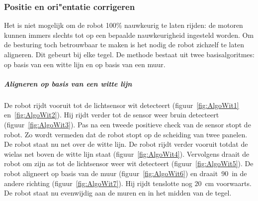 \documentclass[eind]{penoverslag}
\begin{document}
\subsubsection{Positie en ori"entatie corrigeren}
\label{sssec:AlgoAllign}
Het is niet mogelijk om de robot 100\% nauwkeurig te laten rijden: de motoren kunnen immers slechts tot op een bepaalde nauwkeurigheid ingesteld worden. Om de besturing toch betrouwbaar te maken is het nodig de robot zichzelf te laten aligneren. Dit gebeurt bij elke tegel.
De methode bestaat uit twee basisalgoritmes: op basis van een witte lijn en op basis van een muur.

\subparagraph{Aligneren op basis van een witte lijn}
De robot rijdt vooruit tot de lichtsensor wit detecteert (figuur~\ref{fig:AlgoWit1} en~\ref{fig:AlgoWit2}). Hij rijdt verder tot de sensor weer bruin detecteert (figuur~\ref{fig:AlgoWit3}). Pas na een tweede positieve check van de sensor stopt de robot. Zo wordt vermeden dat de robot stopt op de scheiding van twee panelen. De robot staat nu net over de witte lijn. De robot rijdt verder vooruit totdat de wielas net boven de witte lijn staat (figuur~\ref{fig:AlgoWit4}). Vervolgens draait de robot om zijn as tot de lichtsensor weer wit detecteert (figuur~\ref{fig:AlgoWit5}). De robot aligneert op basis van de muur (figuur~\ref{fig:AlgoWit6}) en draait~90\degree~in de andere richting (figuur~\ref{fig:AlgoWit7}). Hij rijdt tenslotte nog $20$~cm voorwaarts. De robot staat nu evenwijdig aan de muren en in het midden van de tegel.
\end{document}
